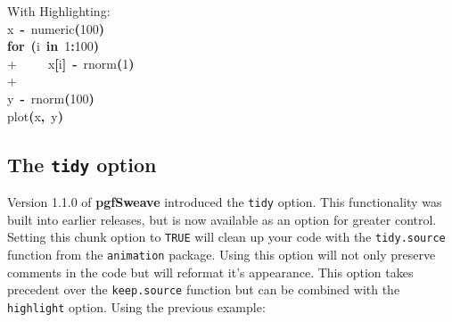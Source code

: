 \documentclass{article}
\newcommand{\code}{\texttt}
\newcommand{\pkg}{\textbf}
\newcommand{\hlnumber}[1]{\textcolor[rgb]{0.0823529411764706,0.0784313725490196,0.709803921568627}{#1}}%
\newcommand{\hlfunctioncall}[1]{\textcolor[rgb]{1,0,0}{#1}}%
\newcommand{\hlkeyword}[1]{\textcolor[rgb]{0,0,0}{\textbf{#1}}}%
\newcommand{\hlassignement}[1]{\textcolor[rgb]{0.215686274509804,0.215686274509804,0.384313725490196}{\textbf{#1}}}%
\newcommand{\hlsymbol}[1]{\textcolor[rgb]{0,0,0}{#1}}%
\newcommand{\hlprompt}[1]{\textcolor[rgb]{0,0,0}{#1}}%
\newcommand{\hlstd}[1]{\textcolor[rgb]{0,0,0}{#1}}%
\begin{document}
With Highlighting:
\hspace*{\fill}\\
\hlstd{}\ttfamily\noindent
\hlprompt{\usebox{\hlnormalsizeboxgreaterthan}{\ }}\hlsymbol{x}{\ }\hlassignement{\usebox{\hlnormalsizeboxlessthan}-}{\ }\hlfunctioncall{numeric}\hlkeyword{(}\hlnumber{100}\hlkeyword{)}\mbox{}
\normalfont
\hspace*{\fill}\\
\hlstd{}\ttfamily\noindent
\hlprompt{\usebox{\hlnormalsizeboxgreaterthan}{\ }}\hlkeyword{for}{\ }\hlkeyword{(}\hlsymbol{i}{\ }\hlkeyword{in}{\ }\hlnumber{1}\hlkeyword{:}\hlnumber{100}\hlkeyword{)}{\ }\hlkeyword{\usebox{\hlnormalsizeboxopenbrace}}\hspace*{\fill}\\
\hlstd{}\hlprompt{+{\ }}{\ }{\ }{\ }{\ }\hlsymbol{x}\hlkeyword{[}\hlsymbol{i}\hlkeyword{]}{\ }\hlassignement{\usebox{\hlnormalsizeboxlessthan}-}{\ }\hlfunctioncall{rnorm}\hlkeyword{(}\hlnumber{1}\hlkeyword{)}\hspace*{\fill}\\
\hlstd{}\hlprompt{+{\ }}\hlkeyword{\usebox{\hlnormalsizeboxclosebrace}}\mbox{}
\normalfont
\hspace*{\fill}\\
\hlstd{}\ttfamily\noindent
\hlprompt{\usebox{\hlnormalsizeboxgreaterthan}{\ }}\hlsymbol{y}{\ }\hlassignement{\usebox{\hlnormalsizeboxlessthan}-}{\ }\hlfunctioncall{rnorm}\hlkeyword{(}\hlnumber{100}\hlkeyword{)}\mbox{}
\normalfont
\hspace*{\fill}\\
\hlstd{}\ttfamily\noindent
\hlprompt{\usebox{\hlnormalsizeboxgreaterthan}{\ }}\hlfunctioncall{plot}\hlkeyword{(}\hlsymbol{x}\hlkeyword{,}{\ }\hlsymbol{y}\hlkeyword{)}\mbox{}
\normalfont
\hspace*{\fill}\\
\hlstd{}


\subsection{The \code{tidy} option}
Version 1.1.0 of \pkg{pgfSweave} introduced the \code{tidy} option.  This functionality was built into earlier releases, but is now available as an option for greater control.  Setting this chunk option to \code{TRUE} will clean up your code with the \code{tidy.source} function from the \code{animation} package. Using this option will not only preserve comments in the code but will reformat it's appearance.  This option takes precedent over the \code{keep.source} function but can be combined with the \code{highlight} option. Using the previous example:
\end{document}
